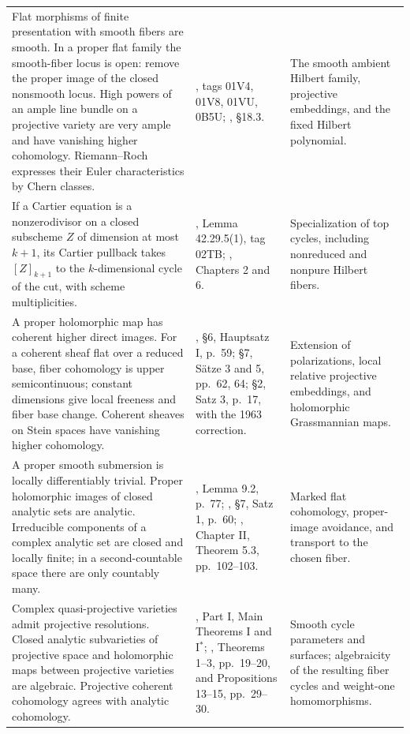 \begin{longtable}{@{}>{\raggedright\arraybackslash}p{}>{\raggedright\arraybackslash}p{}>{\raggedright\arraybackslash}p{}@{}}
Flat morphisms of finite presentation with smooth fibers are smooth.
In a proper flat family the smooth-fiber locus is open: remove the
proper image of the closed nonsmooth locus.  High powers of an ample
line bundle on a projective variety are very ample and have vanishing
higher cohomology.  Riemann--Roch expresses their Euler characteristics
by Chern classes. &
\cite{StacksFamilies}, tags 01V4, 01V8, 01VU, 0B5U;
\cite{Fulton}, \S18.3. &
The smooth ambient Hilbert family, projective embeddings, and the fixed
Hilbert polynomial. \\[3pt]

If a Cartier equation is a nonzerodivisor on a closed subscheme $Z$ of
dimension at most $k+1$, its Cartier pullback takes $[Z]_{k+1}$ to the
$k$-dimensional cycle of the cut, with scheme multiplicities. &
\cite{StacksCartier}, Lemma 42.29.5(1), tag 02TB;
\cite{Fulton}, Chapters 2 and 6. &
Specialization of top cycles, including nonreduced and nonpure Hilbert
fibers. \\[3pt]

A proper holomorphic map has coherent higher direct images.  For a
coherent sheaf flat over a reduced base, fiber cohomology is upper
semicontinuous; constant dimensions give local freeness and fiber base
change.  Coherent sheaves on Stein spaces have vanishing higher
cohomology. &
\cite{Grauert}, \S6, Hauptsatz I, p.~59;
\S7, S\"atze 3 and 5, pp.~62, 64;
\S2, Satz 3, p.~17, with the 1963 correction. &
Extension of polarizations, local relative projective embeddings, and
holomorphic Grassmannian maps. \\[3pt]

A proper smooth submersion is locally differentiably trivial.  Proper
holomorphic images of closed analytic sets are analytic.  Irreducible
components of a complex analytic set are closed and locally finite;
in a second-countable space there are only countably many. &
\cite{Ehresmann}, Lemma 9.2, p.~77;
\cite{Grauert}, \S7, Satz 1, p.~60;
\cite{Albanese}, Chapter II, Theorem 5.3, pp.~102--103. &
Marked flat cohomology, proper-image avoidance, and transport to the
chosen fiber. \\[3pt]

Complex quasi-projective varieties admit projective resolutions.
Closed analytic subvarieties of projective space and holomorphic maps
between projective varieties are algebraic.  Projective coherent
cohomology agrees with analytic cohomology. &
\cite{Hironaka}, Part I, Main Theorems I and I$^*$;
\cite{SerreGAGA}, Theorems 1--3, pp.~19--20,
and Propositions 13--15, pp.~29--30. &
Smooth cycle parameters and surfaces; algebraicity of the resulting
fiber cycles and weight-one homomorphisms. \\

\end{longtable}
\endgroup
